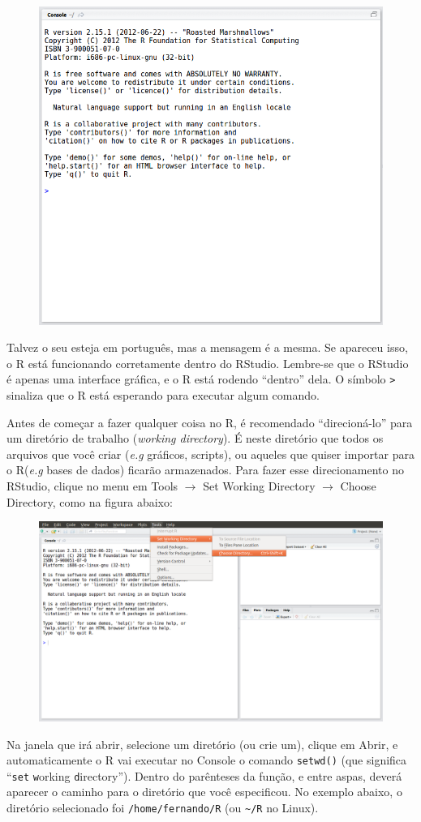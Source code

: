 \documentclass[a4paper,12pt]{article}\usepackage[]{graphicx}\usepackage[]{color}
\providecommand{\eg}{\textit{e.g}\xspace}
\providecommand{\R}{\textsf{R}\xspace}
\providecommand{\RStudio}{\textsf{RStudio}\xspace}
\begin{document}
\begin{figure}[H]
  \centering
  \includegraphics[width=.7\textwidth]{figure/Selection_011}
\end{figure}

Talvez o seu esteja em português, mas a mensagem é a mesma. Se apareceu
isso, o \R está funcionando corretamente dentro do
\RStudio. Lembre-se que o \RStudio é apenas uma interface
gráfica, e o \R está rodendo ``dentro'' dela.  O símbolo \texttt{>}
sinaliza que o \R está esperando para executar algum comando.

Antes de começar a fazer qualquer coisa no \R, é recomendado
``direcioná-lo'' para um diretório de trabalho (\textit{working
  directory}). É neste diretório que todos os arquivos que você criar
(\eg gráficos, scripts), ou aqueles que quiser importar para o \R (\eg
bases de dados) ficarão armazenados. Para fazer esse direcionamento no
\RStudio, clique no menu em \textsf{Tools $\rightarrow$ Set Working
  Directory $\rightarrow$ Choose Directory}, como na figura abaixo:

\begin{figure}[H]
  \centering
  \includegraphics[width=\textwidth]{figure/RStudio_005}
\end{figure}
Na janela que irá abrir, selecione um diretório (ou crie um), clique em
\textsf{Abrir}, e automaticamente o \R vai executar no \textsf{Console}
o comando \texttt{setwd()} (que significa ``\texttt{set} \texttt{w}orking
\texttt{d}irectory''). Dentro do parênteses da função, e entre aspas,
deverá aparecer o caminho para o diretório que você especificou. No
exemplo abaixo, o diretório selecionado foi \texttt{/home/fernando/R}
(ou \verb|~/R| no Linux).
\end{document}
